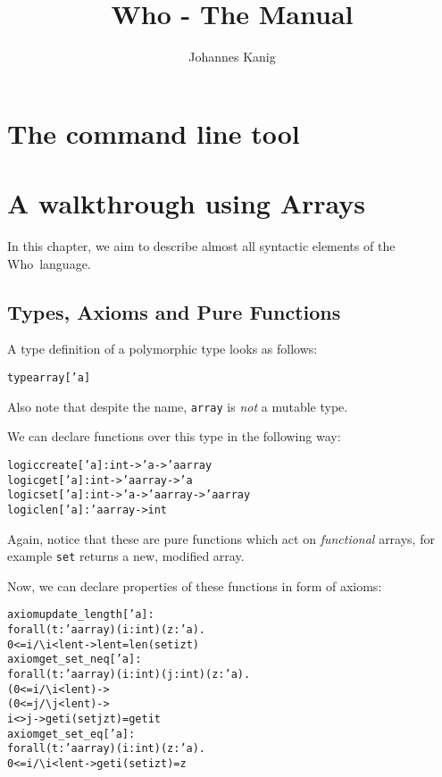 \documentclass[a4paper]{scrreprt}
\newcommand{\who}{Who\xspace}
\begin{document}
\title{Who - The Manual}
\author{Johannes Kanig}

\maketitle
\tableofcontents

\chapter{The command line tool}

\chapter{A walkthrough using Arrays}

In this chapter, we aim to describe almost all syntactic elements of the
\who~language.

\section{Types, Axioms and Pure Functions}

A type definition of a polymorphic type looks as follows:
\begin{alltt}
  type array ['a]
\end{alltt}
Also note that despite the name, {\tt array} is {\em not} a mutable type.

We can declare functions over this type in the following way:
\begin{alltt}
  logic create ['a] :  int -> 'a -> 'a array
  logic get ['a] : int -> 'a array -> 'a
  logic set ['a]: int -> 'a -> 'a array -> 'a array
  logic len ['a] :  'a array -> int
\end{alltt}
Again, notice that these are pure functions which act on {\em functional}
arrays, for example {\tt set} returns a new, modified array.

Now, we can declare properties of these functions in form of axioms:
\begin{alltt}
  axiom update_length ['a] :
    forall (t : 'a array) (i : int) (z : 'a).
    0 <= i \verb|/\| i < len t -> len t = len (set i z t)
  axiom get_set_neq ['a] :
    forall (t : 'a array ) (i : int) (j : int) (z : 'a).
      (0 <= i \verb|/\| i < len t) ->
      (0 <= j \verb|/\| j < len t) ->
        i <> j -> get i (set j z t) = get i t
  axiom get_set_eq ['a] :
    forall (t : 'a array) (i : int) (z : 'a).
      0 <= i \verb|/\| i < len t -> get i (set i z t) = z
\end{alltt}
\end{document}
